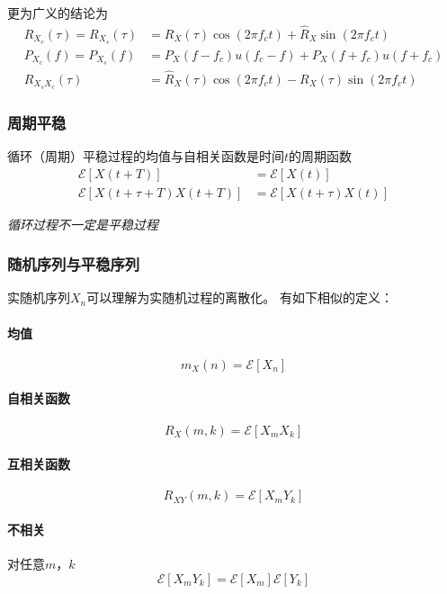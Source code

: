     更为广义的结论为
    \begin{align}
        R_{X_c}(\tau)=R_{X_s}(\tau)&=R_X(\tau)\cos(2\pi f_ct)+\hat{R}_X\sin(2\pi f_ct)\\
        P_{X_c}(f)=P_{X_s}(f)&=P_X(f-f_c)u(f_c-f)+P_X(f+f_c)u(f+f_c)\\
        R_{X_sX_c}(\tau)&=\hat{R}_X(\tau)\cos(2\pi f_ct)-R_X(\tau)\sin(2\pi f_ct)
    \end{align}

    \subsubsection{周期平稳}
    循环（周期）平稳过程的均值与自相关函数是时间$t$的周期函数\vspace{-0.5ex}
    \begin{align}
        \mathscr{E}[X(t+T)]&=\mathscr{E}[X(t)]\\
        \mathscr{E}[X(t+\tau+T)X(t+T)]&=\mathscr{E}[X(t+\tau)X(t)]
    \end{align}

    \emph{循环过程不一定是平稳过程}

    \subsubsection{随机序列与平稳序列}
    实随机序列$X_n$可以理解为实随机过程的离散化。
    有如下相似的定义：

    \paragraph{均值}
    \begin{equation}
        m_X(n)=\mathscr{E}[X_n]
    \end{equation}
    \paragraph{自相关函数}
    \begin{equation}
        R_X(m,k)=\mathscr{E}[X_mX_k]
    \end{equation}
    \paragraph{互相关函数}
    \begin{equation}
        R_{XY}(m,k)=\mathscr{E}[X_mY_k]
    \end{equation}
    \paragraph{不相关}对任意$m$，$k$\vspace{-0.5ex}
    \begin{equation}
        \mathscr{E}[X_mY_k]=\mathscr{E}[X_m]\mathscr{E}[Y_k]
    \end{equation}
